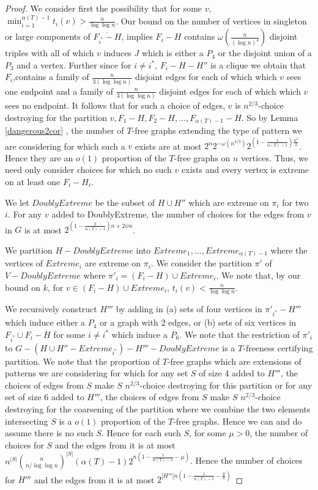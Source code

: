 \documentclass[12pt]{article}
\theoremstyle{definition}
\begin{document}
\begin{proof}
We consider first the possibility that for some $v$, $\min_{i=1}^{\alpha(T)-1} t_i(v)> \frac{n}{\log \log n}$. 
Our bound on the number of  vertices in singleton or large components   of $\overline {F_{i^*}-H}$, implies   $F_i-H$ contains 
 $\omega(\frac{n}{(\log n)^4})$ disjoint triples with  all of which  $v$ induces   $J$ which is either a $P_4$ or the disjoint union of a $P_3$ and a vertex. 
Further since for $i \neq i^*$, $F_i-H-H''$ is a clique we obtain that  $F_i$,contains 
 a family of  $\frac{n}{3 (\log \log n)}$ disjoint edges for  each of which which $v$ sees one endpoint and 
a family of  $\frac{n}{3 (\log \log n)}$ disjoint  edges for  each of which which $v$ sees no  endpoint.
 It follows that  for such a choice of edges, $v$ is
$n^{2/3}$-choice destroying  for the partition $v,F_1-H,F_2-H,...,F_{\alpha(T)-1}-H$. 
So by Lemma \ref{dangerous2cor} , the  number  of $T$-free graphs  extending the type of pattern we are considering  for which such a $v$ exists are  at most 
$2^n2^{-\omega(n^{4/3})}2^{(1-\frac{1}{\alpha(T)-1})\frac{n^2}{2}}$. Hence they are     an $o(1)$ proportion of the $T$-free graphs on $n$ vertices. Thus, we need only consider choices for which no such $v$ exists and every vertex is extreme on at least one $F_i-H_i$. 

We  let $DoublyExtreme$ be the subset of $H \cup H''$ which are extreme on $\pi_i$ for two $i$. 
For any $v$ added to DoublyExtreme, the number of choices for the edges from 
$v$ in $G$ is at most $2^{(1-\frac{2}{\alpha(T)-1})n+2\psi n}$. 

We partition $H -DoublyExtreme$ into $Extreme_1,...,Extreme_{\alpha(T)-1}$ where the vertices of $Extreme_i$ are extreme on $\pi_i$.
We consider the partition $ \pi'$  of $V-DoublyExtreme$ where $\pi'_i=(F_i-H) \cup Extreme_i$. 
We note that, by our bound on $k$, for $v \in  (F_i -H) \cup Extreme_i$, $t_i(v)<\frac{n}{\log \log n}$.

We recursively construct $H'''$ by adding in  (a)  sets of  four vertices  in  $\pi'_{i^*} -H'''$ which induce either 
a $P_4$ or a graph with 2 edges, or (b) sets of six vertices in $F_{i^*} \cup F_i-H$  for some $i \neq i^*$ which induce a $P_6$.
We note that the restriction of $\pi'_i$ to  $G-(H \cup H'' -Extreme_{i^*})-H'''-DoublyExtreme$ is a $T$-freeness certifying partition. 
We note that  the proportion of $T$-free graphs which are extensions of patterns we are considering for which  for any set $S$ of size 4 added to $H'''$, the choices of edges from $S$ make $S$ $n^{2/3}$-choice destroying for this partition  or for any set of size 6  added to $H'''$, the choices of edges from $S$ make $S$ $n^{2/3}$-choice destroying for the coarsening of the partition where we combine the two elements intersecting $S$  is  a $o(1)$ proportion of the $T$-free graphs. Hence we can and do assume there is no such $S$. 
Hence for each such $S$,  for some $\mu>0$, the number of choices for $S$ and  the edges from it is at most $n^{|S|}{n \choose n/ \log \log n}^{|S|}(\alpha(T)-1)2^{n(1-\frac{1}{\alpha(T)-1}-\mu)}$.
Hence the number of choices for $H'''$ and the edges from it is at most $2^{|H'''|n(1-\frac{1}{\alpha(T)-1}-\frac{\mu}{8})}$



\end{proof}
\end{document}
